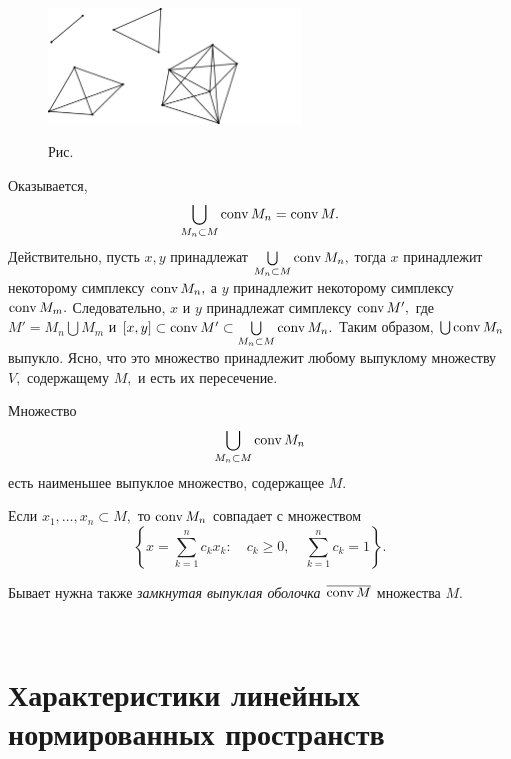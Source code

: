   \begin{figure}[ht]
\begin{center}
\includegraphics[width=0.6\textwidth]{pict/pict08-2.eps}
\end{center}
 \bigskip
 \label{r8-2}

 \centerline{Рис.~\theris}
 \bigskip
\end{figure}

 \vspace{5mm}

Оказывается,
 $$
 \bigcup_{M_n\subset M} {\rm conv\,} M_n={\rm conv\,} M.
 $$
 Действительно, пусть $x,y$ принадлежат
 $ \bigcup\limits_{M_n\subset M} {\rm conv\,} M_n,$
 тогда $x$ принадлежит некоторому симплексу ${\rm conv\,} M_n,$
 а $y$ принадлежит некоторому симплексу ${\rm conv\,} M_m.$
 Следовательно, $x$ и $y$ принадлежат {симплексу} ${\rm conv\,} M',$ где $M'=M_n
 \bigcup M_m$ и $[x,y]\subset {\rm conv\,} M' \subset
 \bigcup\limits_{M_n\subset M} {\rm conv\,} M_n.$ Таким образом, $\bigcup
 {\rm conv\,} M_n$ выпукло. {Ясно, что это множество} принадлежит любому выпуклому множеству $V,$
 содержащему $M,$ и есть их пересечение.

 \begin{Corollary} %
 {Множество}
 $$
 \bigcup_{M_n\subset M} {\rm conv\,} M_n
 $$
 есть наименьшее выпуклое множество, содержащее $M.$
 \end{Corollary}

 \begin{Remark} %
 Если $x_1,\ldots, x_n\subset M,$ то ${\rm conv\,} M_n$ {совпадает с множеством}
 $$
 \left\{x=\sum\limits_{k=1}^n c_kx_k:\quad c_k\ge 0,\quad \sum\limits_{k=1}^n
 c_k=1\right\}.
 $$
 \end{Remark}

Бывает нужна также {\it замкнутая выпуклая оболочка} $\overline{{\rm conv\,} M}$
множества $M.$

\ \

\section{Характеристики линейных нормированных пространств}

